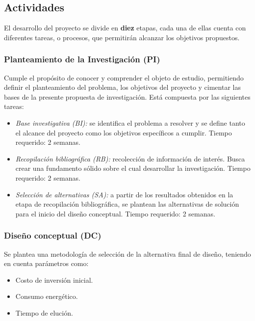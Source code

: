 \subsection{Actividades}

\noindent
\justify

El desarrollo del proyecto se divide en \textbf{diez} etapas, cada una de ellas cuenta con diferentes tareas, o procesos, que permitir\'an alcanzar los objetivos propuestos.

\subsubsection{Planteamiento de la Investigaci\'on (PI)}

\noindent
\justify

Cumple el prop\'osito de conocer y comprender el objeto de estudio, permitiendo definir el planteamiento del problema, los objetivos del proyecto y cimentar las bases de la presente propuesta de investigaci\'on. Est\'a compuesta por las siguientes tareas:

\begin{itemize}
	\item \textit{Base investigativa (BI):} se identifica el problema a resolver y se define tanto el alcance del proyecto como los objetivos espec\'ificos a cumplir. Tiempo requerido: 2 semanas.
	\item \textit{Recopilaci\'on bibliogr\'afica (RB):} recolecci\'on de informaci\'on de inter\'es. Busca crear una fundamento s\'olido sobre el cual desarrollar la investigaci\'on. Tiempo requerido: 2 semanas.
	\item \textit{Selecci\'on de alternativas (SA):} a partir de los resultados obtenidos en la etapa de recopilaci\'on bibliogr\'afica, se plantean las alternativas de soluci\'on para el inicio del dise\~no conceptual. Tiempo requerido: 2 semanas.
\end{itemize}

\subsubsection{Dise\~no conceptual (DC)}

\noindent
\justify

Se plantea una metodolog\'ia de selecci\'on de la alternativa final de dise\~no, teniendo en cuenta par\'ametros como:

\begin{itemize}
	\item Costo de inversi\'on inicial.
	\item Consumo energ\'etico.
	\item Tiempo de eluci\'on.
\end{itemize}

